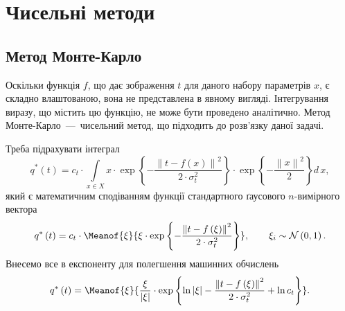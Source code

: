 \section{Чисельні методи}

\subsection{Метод Монте-Карло}

Оскільки функція $f$, що дає зображення $t$ для даного набору параметрів $x$,
є складно влаштованою, вона не представлена в явному вигляді.
Інтегрування виразу, що містить цю функцію, не може бути проведено аналітично.
Метод Монте-Карло~---~чисельний метод, що підходить до розв'язку даної задачі.

Треба підрахувати інтеграл
\begin{equation}\label{eq:monte-carlo:source}
  q^* \left( t \right)
  = c_t
    \cdot \int\limits_{x \in X}
      x
      \cdot \exp{\left\{ - \frac{\left\| t - f\left( x \right) \right\|^2}
                                {2 \cdot \sigma^2_t}\right\}}
      \cdot \exp{\left\{ - \frac{\left\| x \right\|^2}{2} \right\}}
    d\,x,
\end{equation}
який є математичним сподіванням функції
стандартного ґаусового $n$-вимірного вектора
\begin{equation*}
  q^* \left( t \right)
  = c_t
    \cdot \Meanof{\xi}{
      \xi
      \cdot \exp{\left\{
          - \frac{\left\| t - f\left( \xi \right) \right\|^2}
                 {2 \cdot \sigma^2_t}
            \right\}}}, \qquad
    \xi_i \sim \mathcal{N}\left( 0, 1 \right).
\end{equation*}
Внесемо все в експоненту для полегшення машинних обчислень
\begin{equation*}
  q^* \left( t \right)
  = \Meanof{\xi}{
    \frac{\xi}{\left| \xi \right|}
    \cdot \exp{\left\{
        \ln{\left| \xi \right|}
        - \frac{\left\| t - f\left( \xi \right) \right\|^2}{2 \cdot \sigma^2_t}
        + \ln{c_t}
       \right\}
    }}.
\end{equation*}

